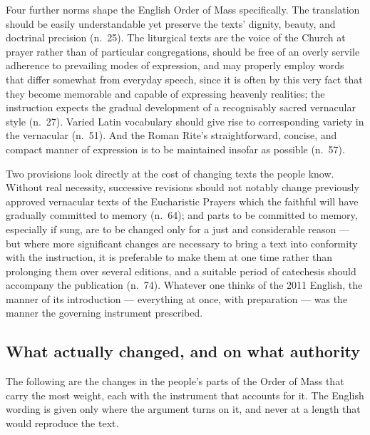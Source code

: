 Four further norms shape the English Order of Mass specifically. The translation should be
easily understandable yet preserve the texts' dignity, beauty, and doctrinal precision (n.\ 25).
The liturgical texts are the voice of the Church at prayer rather than of particular
congregations, should be free of an overly servile adherence to prevailing modes of expression,
and may properly employ words that differ somewhat from everyday speech, since it is often by
this very fact that they become memorable and capable of expressing heavenly realities; the
instruction expects the gradual development of a recognisably sacred vernacular style (n.\ 27).
Varied Latin vocabulary should give rise to corresponding variety in the vernacular (n.\ 51).
And the Roman Rite's straightforward, concise, and compact manner of expression is to be
maintained insofar as possible (n.\ 57).

Two provisions look directly at the cost of changing texts the people know. Without real
necessity, successive revisions should not notably change previously approved vernacular texts
of the Eucharistic Prayers which the faithful will have gradually committed to memory (n.\ 64);
and parts to be committed to memory, especially if sung, are to be changed only for a just and
considerable reason --- but where more significant changes are necessary to bring a text into
conformity with the instruction, it is preferable to make them at one time rather than
prolonging them over several editions, and a suitable period of catechesis should accompany the
publication (n.\ 74). Whatever one thinks of
the 2011 English, the manner of its introduction --- everything at once, with preparation ---
was the manner the governing instrument prescribed.

\subsection{What actually changed, and on what authority}

The following are the changes in the people's parts of the Order of Mass that carry the most
weight, each with the instrument that accounts for it. The English wording is given only where
the argument turns on it, and never at a length that would reproduce the text.

